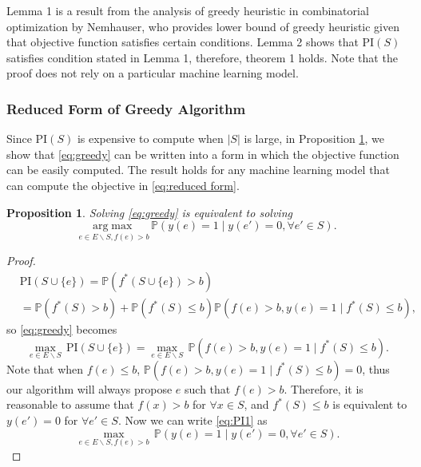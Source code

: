 \documentclass[11pt]{article}
\newcommand{\Prob}{\mathbb{P}}
\newcommand{\PI}{\text{PI}}
\newtheorem{proposition}{Proposition}
\begin{document}
Lemma 1 is a result from the analysis of greedy heuristic in combinatorial optimization by 
Nemhauser, who provides lower bound of greedy heuristic given that objective function 
satisfies certain conditions. Lemma 2 shows that $\PI(S)$ satisfies condition stated in 
Lemma 1, therefore, theorem 1 holds. Note that the proof does not rely on a particular machine
learning model.

\subsubsection{Reduced Form of Greedy Algorithm} \label{sec:reduced form}
Since $\PI(S)$ is expensive to compute when $|S|$ is large, in Proposition 
\ref{prop:reduced form}, we show that \eqref{eq:greedy} can be written into a
form in which the objective function can be easily computed. The result
holds for any machine learning model that can compute the objective in
\eqref{eq:reduced form}.
\begin{proposition} \label{prop:reduced form}
  Solving \eqref{eq:greedy} is equivalent to solving
  \begin{equation}
    \underset{e \in E \backslash S, f(e) > b}{\mathrm{arg}\max} \, \Prob (y(e)=1 \mid y(e') = 0, \forall e' \in S).
    \label{eq:reduced form}
  \end{equation}
\end{proposition}
\begin{proof}
  \begin{equation*}
    \begin{split}
      &\PI(S \cup \{e\}) = \Prob(f^*(S\cup \{e\}) > b)\\
      &= \Prob(f^*(S) > b) + \Prob(f^*(S)\leq b) \Prob(f(e) > b, y(e) = 1 \mid f^*(S)\leq b),
    \end{split}
  \end{equation*}
  so \eqref{eq:greedy} becomes
  \begin{equation} \label{eq:PI1} 
    \underset{e \in E \backslash S}{\max} \, \PI(S \cup \{e\}) = \underset{e \in E \backslash S}{\max} \, \Prob(f(e) > b, y(e)=1 \mid f^*(S)\leq b).
  \end{equation}
  Note that when $f(e) \leq b$, $\Prob(f(e) > b, y(e) = 1 \mid f^*(S)\leq b) = 0$, thus our algorithm will always propose $e$ such that $f(e) > b$. Therefore, it is reasonable to assume that $f(x) > b$ for $\forall x \in S$, and $f^*(S)\leq b$ is equivalent to $y(e') = 0$ for $\forall e' \in S$. Now we can write \eqref{eq:PI1} as 
  \begin{equation*}
    \underset{e \in E \backslash S, f(e) > b}{\max} \, \Prob (y(e) = 1 \mid y(e') = 0, \forall e' \in S). 
  \end{equation*}
\end{proof}
\end{document}
